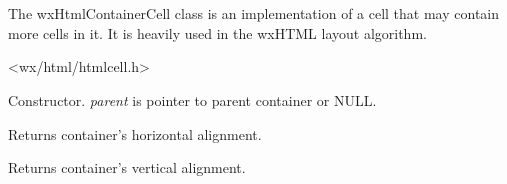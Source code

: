 
\section{}\label{wxhtmlcontainercell}

The wxHtmlContainerCell class is an implementation of a cell that may
contain more cells in it. It is heavily used in the wxHTML layout algorithm.




<wx/html/htmlcell.h>






\label{wxhtmlcontainercellwxhtmlcontainercell}


Constructor. {\it parent} is pointer to parent container or NULL.


\label{wxhtmlcontainercellgetalignhor}


Returns container's horizontal alignment.

\label{wxhtmlcontainercellgetalignver}


Returns container's vertical alignment.

\label{wxhtmlcontainercellgetbackgroundcolour}

